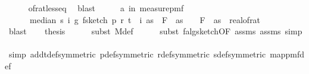 \begin{isabellebody}
\ \ \ \ \isamarkupfalse%
\ of{\isacharunderscore}{\kern0pt}rat{\isacharunderscore}{\kern0pt}less{\isacharunderscore}{\kern0pt}eq\ \isamarkupfalse%
\ blast\isanewline
\ \ \isamarkupfalse%
\ \isamarkupfalse%
\ a{\isacharcolon}{\kern0pt}{\isachardoublequoteopen}{\isasymP}{\isacharparenleft}{\kern0pt}{\isasymomega}\ in\ measure{\isacharunderscore}{\kern0pt}pmf\ {\isasymOmega}\ \ \isanewline
\ \ \ \ \ \ {\isasymbar}median\ s\ {\isacharparenleft}{\kern0pt}{\isasymlambda}i{\isachardot}{\kern0pt}\ g\ {\isacharparenleft}{\kern0pt}f{}{\isacharunderscore}{\kern0pt}sketch\ p\ r\ t\ {\isacharparenleft}{\kern0pt}{\isasymomega}\ i{\isacharparenright}{\kern0pt}\ as{\isacharparenright}{\kern0pt}{\isacharparenright}{\kern0pt}\ {\isacharminus}{\kern0pt}\ F\ {}\ as{\isasymbar}\ {\isasymle}\ {\isasymdelta}\ {\isacharasterisk}{\kern0pt}\ F\ {}\ as{\isacharparenright}{\kern0pt}\ {\isasymge}\ {}{\isacharminus}{\kern0pt}real{\isacharunderscore}{\kern0pt}of{\isacharunderscore}{\kern0pt}rat\ {\isasymepsilon}{\isachardoublequoteclose}\isanewline
\ \ \ \ \isamarkupfalse%
\ blast\isanewline
\isanewline
\ \ \isamarkupfalse%
\ {\isacharquery}{\kern0pt}thesis\isanewline
\ \ \ \ \isamarkupfalse%
\ {\isacharparenleft}{\kern0pt}subst\ M{\isacharunderscore}{\kern0pt}def{\isacharparenright}{\kern0pt}\isanewline
\ \ \ \ \isamarkupfalse%
\ {\isacharparenleft}{\kern0pt}subst\ f{}{\isacharunderscore}{\kern0pt}alg{\isacharunderscore}{\kern0pt}sketch{\isacharbrackleft}{\kern0pt}OF\ assms{\isacharparenleft}{\kern0pt}{}{\isacharparenright}{\kern0pt}\ assms{\isacharparenleft}{\kern0pt}{}{\isacharparenright}{\kern0pt}{\isacharbrackright}{\kern0pt}{\isacharcomma}{\kern0pt}\ simp{\isacharparenright}{\kern0pt}\isanewline
\ \ \ \ \isamarkupfalse%
\ {\isacharparenleft}{\kern0pt}simp\ add{\isacharcolon}{\kern0pt}t{\isacharunderscore}{\kern0pt}def{\isacharbrackleft}{\kern0pt}symmetric{\isacharbrackright}{\kern0pt}\ p{\isacharunderscore}{\kern0pt}def{\isacharbrackleft}{\kern0pt}symmetric{\isacharbrackright}{\kern0pt}\ r{\isacharunderscore}{\kern0pt}def{\isacharbrackleft}{\kern0pt}symmetric{\isacharbrackright}{\kern0pt}\ s{\isacharunderscore}{\kern0pt}def{\isacharbrackleft}{\kern0pt}symmetric{\isacharbrackright}{\kern0pt}\ map{\isacharunderscore}{\kern0pt}pmf{\isacharunderscore}{\kern0pt}def{\isacharparenright}{\kern0pt}\isanewline

\end{isabellebody}
